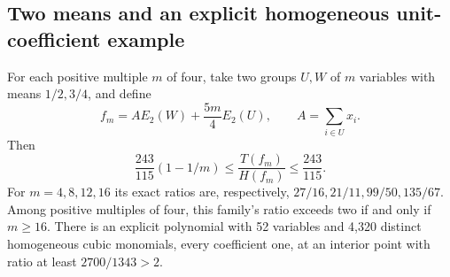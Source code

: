 \subsection{Two means and an explicit homogeneous unit-coefficient example}
\begin{theorem}\label{thm:cubic-two-level}
For each positive multiple $m$ of four, take two groups $U,W$ of $m$
variables with means $1/2,3/4$, and define
\begin{equation}\label{eq:two-level-family}
 f_m=A E_2(W)+\frac{5m}{4}E_2(U),\qquad A=\sum_{i\in U}x_i.
\end{equation}
Then
\begin{equation}\label{eq:two-level-ratio}
 \frac{243}{115}(1-1/m)\le\frac{T(f_m)}{H(f_m)}\le\frac{243}{115}.
\end{equation}
For $m=4,8,12,16$ its exact ratios are, respectively,
$27/16,21/11,99/50,135/67$. Among positive multiples of four,
this family's ratio exceeds two if and only if $m\ge16$.
There is an explicit polynomial
with 52 variables and 4,320 distinct homogeneous cubic monomials, every
coefficient one, at an interior point with ratio at least $2700/1343>2$.
\end{theorem}
